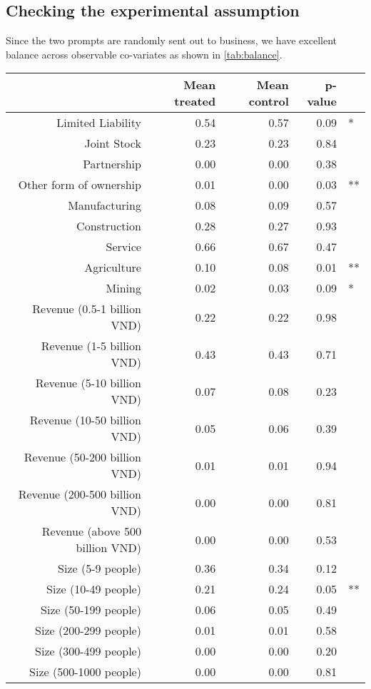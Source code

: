 \subsection{Checking the experimental assumption}

Since the two prompts are randomly sent out to business, we have excellent balance across observable co-variates as shown in \autoref{tab:balance}.

\begin{table}[ht]
\centering
\begin{tabular}{rrrrl}
  \hline
 & Mean treated & Mean control & p-value &   \\ 
  \hline
Limited Liability & 0.54 & 0.57 & 0.09 & * \\ 
  Joint Stock & 0.23 & 0.23 & 0.84 &  \\ 
  Partnership & 0.00 & 0.00 & 0.38 &  \\ 
  Other form of ownership & 0.01 & 0.00 & 0.03 & ** \\ 
  Manufacturing & 0.08 & 0.09 & 0.57 &  \\ 
  Construction & 0.28 & 0.27 & 0.93 &  \\ 
  Service & 0.66 & 0.67 & 0.47 &  \\ 
  Agriculture & 0.10 & 0.08 & 0.01 & ** \\ 
  Mining & 0.02 & 0.03 & 0.09 & * \\ 
  Revenue (0.5-1 billion VND) & 0.22 & 0.22 & 0.98 &  \\ 
  Revenue (1-5 billion VND) & 0.43 & 0.43 & 0.71 &  \\ 
  Revenue (5-10 billion VND) & 0.07 & 0.08 & 0.23 &  \\ 
  Revenue (10-50 billion VND) & 0.05 & 0.06 & 0.39 &  \\ 
  Revenue (50-200 billion VND) & 0.01 & 0.01 & 0.94 &  \\ 
  Revenue (200-500 billion VND) & 0.00 & 0.00 & 0.81 &  \\ 
  Revenue (above 500 billion VND) & 0.00 & 0.00 & 0.53 &  \\ 
  Size (5-9 people) & 0.36 & 0.34 & 0.12 &  \\ 
  Size (10-49 people) & 0.21 & 0.24 & 0.05 & ** \\ 
  Size (50-199 people) & 0.06 & 0.05 & 0.49 &  \\ 
  Size (200-299 people) & 0.01 & 0.01 & 0.58 &  \\ 
  Size (300-499 people) & 0.00 & 0.00 & 0.20 &  \\ 
  Size (500-1000 people) & 0.00 & 0.00 & 0.81 &  \\ 

\end{tabular}
\end{table}
